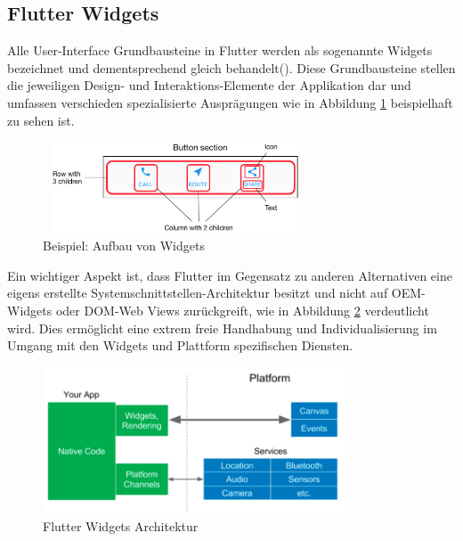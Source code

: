 \documentclass[bibliography=totoc,listof=totoc,BCOR=5mm,DIV=12,oneside]{scrbook}
\begin{document}
\newpage
\subsection{Flutter Widgets}
\par Alle User-Interface Grundbausteine in Flutter werden als sogenannte Widgets bezeichnet und dementsprechend gleich behandelt(\cite{Flu5}). Diese Grundbausteine stellen die jeweiligen Design- und Interaktions-Elemente der Applikation dar und umfassen verschieden spezialisierte Ausprägungen wie in Abbildung \ref{img:FlutterWidgetButtonSectionExample} beispielhaft zu sehen ist.

\bigskip
\begin{figure}[H]
	\centering
	\includegraphics[width=0.8\textwidth, keepaspectratio]{Bilder/FlutterWidgetButtonSectionExample.png}
	\caption{Beispiel: Aufbau von Widgets  \cite{FlutterBuildingLayouts}}
	\label{img:FlutterWidgetButtonSectionExample}
\end{figure}

\par \medskip Ein wichtiger Aspekt ist, dass Flutter im Gegensatz zu anderen Alternativen eine eigens erstellte Systemschnittstellen-Architektur besitzt und nicht auf OEM-Widgets oder DOM-Web Views zurückgreift\citep{HackernoonFlutterArcticle}, wie in Abbildung \ref{img:hackernoonFlutterArcticleArchitecture} verdeutlicht wird. Dies ermöglicht eine extrem freie Handhabung und Individualisierung im Umgang mit den Widgets und Plattform spezifischen Diensten.

\bigskip
\begin{figure}[H]
	\centering
	\includegraphics[width=0.8\textwidth, keepaspectratio]{Bilder/WidgetsFlutterArchitecture.png}
	\caption{Flutter Widgets Architektur \cite{HackernoonFlutterArcticle}}
	\label{img:hackernoonFlutterArcticleArchitecture}
\end{figure}
\end{document}

